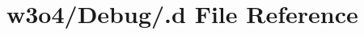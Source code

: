 \hypertarget{w3o4_2_debug_2_8d}{}\section{w3o4/\+Debug/.d File Reference}
\label{w3o4_2_debug_2_8d}

